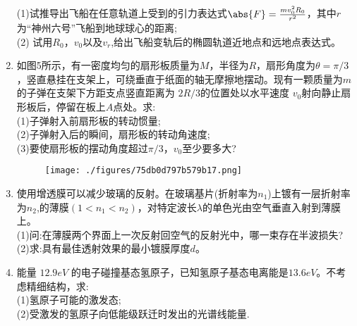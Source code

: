 \begin{enumerate}
(1)试推导出飞船在任意轨道上受到的引力表达式$\abs{F}=\frac{mv_0^2R_0}{r^2}$，其中$r$为“神州六号”飞船到地球球心的距离;\\
(2) 试用$ R_0$，$v_0$以及$v_r$,给出飞船变轨后的椭圆轨道近地点和远地点表达式。
\item 如图5所示，有一密度均匀的扇形板质量为$M$，半径为$R$，扇形角度为$\theta=\pi/3$，竖直悬挂在支架上，可绕垂直于纸面的轴无摩擦地摆动。现有一颗质量为$m$的子弹在支架下方距支点竖直距离为 $2R/3$的位置处以水平速度 $v_0$射向静止扇形板后，停留在板上$A$点处。求:\\
(1)子弹射入前扇形板的转动惯量;\\
(2)子弹射入后的瞬间，扇形板的转动角速度;\\
(3)要使扇形板的摆动角度超过$\pi/3$，$v_0$至少要多大?
\begin{figure}[ht]
\centering
\texttt{[image: ./figures/75db0d797b579b17.png]}
\caption{} \label{fig_ZKYP06_6}
\end{figure}
\item 使用增透膜可以减少玻璃的反射。在玻璃基片(折射率为$n_1$)上镀有一层折射率为$n_2$,的薄膜$(1<n_1<n_2)$，对特定波长$\lambda$的单色光由空气垂直入射到薄膜上。\\
(1)问:在薄膜两个界面上一次反射回空气的反射光中，哪一束存在半波损失?
(2)求:具有最佳透射效果的最小镀膜厚度$d$。
\item 能量 $12.9eV$ 的电子碰撞基态氢原子，已知氢原子基态电离能是$ 13.6eV$。不考虑精细结构，求:\\
(1)氢原子可能的激发态;\\
(2)受激发的氢原子向低能级跃迁时发出的光谱线能量.
\end{enumerate}